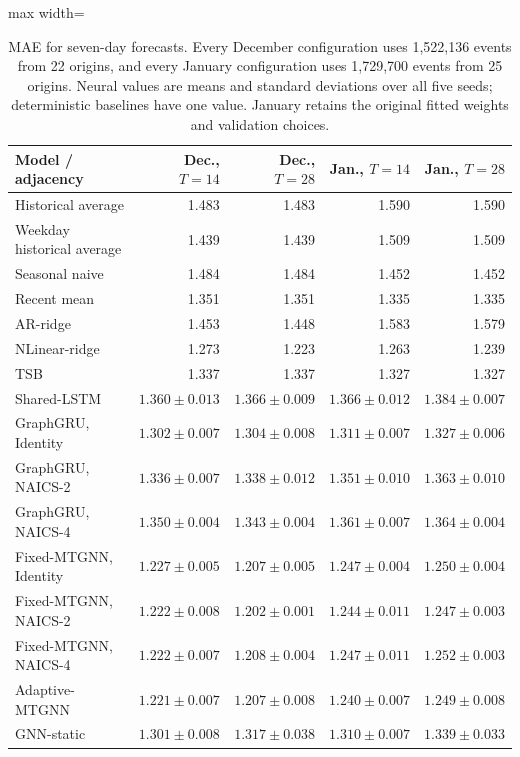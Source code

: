 \begin{table}[!htbp]
\centering
\begingroup
\singlespacing
\fontsize{9pt}{10.5pt}\selectfont
\setlength{\tabcolsep}{4pt}
\renewcommand{\arraystretch}{1.08}
\caption{MAE for seven-day forecasts. Every December configuration uses 1,522,136 events from 22 origins, and every January configuration uses 1,729,700 events from 25 origins. Neural values are means and standard deviations over all five seeds; deterministic baselines have one value. January retains the original fitted weights and validation choices.}
\label{tab:multihorizon}
\begin{adjustbox}{max width=\linewidth}
\begin{tabular}{lrrrr}
\toprule
Model / adjacency & Dec., $T=14$ & Dec., $T=28$ & Jan., $T=14$ & Jan., $T=28$ \\
\midrule
Historical average & 1.483 & 1.483 & 1.590 & 1.590 \\
Weekday historical average & 1.439 & 1.439 & 1.509 & 1.509 \\
Seasonal naive & 1.484 & 1.484 & 1.452 & 1.452 \\
Recent mean & 1.351 & 1.351 & 1.335 & 1.335 \\
AR-ridge & 1.453 & 1.448 & 1.583 & 1.579 \\
NLinear-ridge & 1.273 & 1.223 & 1.263 & 1.239 \\
TSB & 1.337 & 1.337 & 1.327 & 1.327 \\
Shared-LSTM & $1.360\pm 0.013$ & $1.366\pm 0.009$ & $1.366\pm 0.012$ & $1.384\pm 0.007$ \\
GraphGRU, Identity & $1.302\pm 0.007$ & $1.304\pm 0.008$ & $1.311\pm 0.007$ & $1.327\pm 0.006$ \\
GraphGRU, NAICS-2 & $1.336\pm 0.007$ & $1.338\pm 0.012$ & $1.351\pm 0.010$ & $1.363\pm 0.010$ \\
GraphGRU, NAICS-4 & $1.350\pm 0.004$ & $1.343\pm 0.004$ & $1.361\pm 0.007$ & $1.364\pm 0.004$ \\
Fixed-MTGNN, Identity & $1.227\pm 0.005$ & $1.207\pm 0.005$ & $1.247\pm 0.004$ & $1.250\pm 0.004$ \\
Fixed-MTGNN, NAICS-2 & $1.222\pm 0.008$ & $1.202\pm 0.001$ & $1.244\pm 0.011$ & $1.247\pm 0.003$ \\
Fixed-MTGNN, NAICS-4 & $1.222\pm 0.007$ & $1.208\pm 0.004$ & $1.247\pm 0.011$ & $1.252\pm 0.003$ \\
Adaptive-MTGNN & $1.221\pm 0.007$ & $1.207\pm 0.008$ & $1.240\pm 0.007$ & $1.249\pm 0.008$ \\
GNN-static & $1.301\pm 0.008$ & $1.317\pm 0.038$ & $1.310\pm 0.007$ & $1.339\pm 0.033$ \\
\bottomrule
\end{tabular}
\end{adjustbox}
\endgroup
\end{table}
